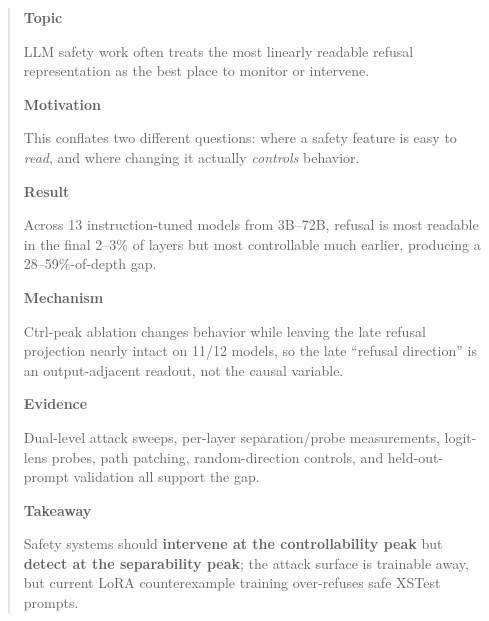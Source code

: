 \documentclass{article}
\newcommand{\annrow}[3]{%
  \noindent\colorbox{#1}{\parbox[t]{0.17\linewidth}{\scriptsize\bfseries #2}}%
  \hspace{0.012\linewidth}%
  \colorbox{#1!45}{\parbox[t]{0.77\linewidth}{\footnotesize #3}}%
  \par\vspace{0.25em}%
}
\begin{document}

\makeatletter
\gdef\@icmltitlerunning{Readability Isn't Controllability}
\makeatother

\printAffiliationsAndNotice{}

\begin{abstract}
\annrow{topicshade}{Topic}{LLM safety work often treats the most linearly readable refusal representation as the best place to monitor or intervene.}
\annrow{motiveshade}{Motivation}{This conflates two different questions: where a safety feature is easy to \emph{read}, and where changing it actually \emph{controls} behavior.}
\annrow{contribshade}{Result}{Across 13 instruction-tuned models from 3B--72B, refusal is most readable in the final 2--3\% of layers but most controllable much earlier, producing a 28--59\%-of-depth gap.}
\annrow{nuanceshade}{Mechanism}{Ctrl-peak ablation changes behavior while leaving the late refusal projection nearly intact on 11/12 models, so the late ``refusal direction'' is an output-adjacent readout, not the causal variable.}
\annrow{evidenceshade}{Evidence}{Dual-level attack sweeps, per-layer separation/probe measurements, logit-lens probes, path patching, random-direction controls, and held-out-prompt validation all support the gap.}
\annrow{impactshade}{Takeaway}{Safety systems should \textbf{intervene at the controllability peak} but \textbf{detect at the separability peak}; the attack surface is trainable away, but current LoRA counterexample training over-refuses safe XSTest prompts.}
\end{abstract}
\end{document}
